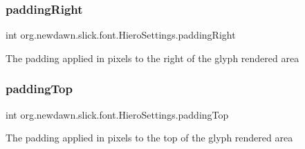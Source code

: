 \subsubsection{\texorpdfstring{padding\+Right}{paddingRight}}
{\footnotesize\ttfamily int org.\+newdawn.\+slick.\+font.\+Hiero\+Settings.\+padding\+Right\hspace{0.3cm}{\ttfamily [private]}}

The padding applied in pixels to the right of the glyph rendered area \mbox{\label{classorg_1_1newdawn_1_1slick_1_1font_1_1_hiero_settings_ad0793e48192b48898df4f3a31d4b3954}} 
\subsubsection{\texorpdfstring{padding\+Top}{paddingTop}}
{\footnotesize\ttfamily int org.\+newdawn.\+slick.\+font.\+Hiero\+Settings.\+padding\+Top\hspace{0.3cm}{\ttfamily [private]}}

The padding applied in pixels to the top of the glyph rendered area 